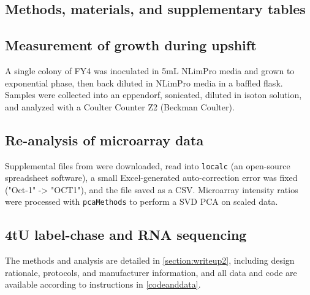 \subsection{Methods, materials, and supplementary tables}


\subsection{Measurement of growth during upshift}

A single colony of FY4 was inoculated in 5mL NLimPro 
media and grown to exponential phase, then back diluted in NLimPro media
in a baffled flask. 
Samples were collected into an eppendorf, sonicated,
diluted in isoton solution, and analyzed with a Coulter Counter Z2
(Beckman Coulter).

\subsection{Re-analysis of microarray data} 

Supplemental files from \cite{Airoldi2016} were 
downloaded, read
into \texttt{localc} (an open-source spreadsheet software), 
a small Excel-generated auto-correction error was 
fixed ("Oct-1" -> "OCT1"), and the file saved as a CSV. Microarray 
intensity ratios were processed with 
\texttt{pcaMethods} to perform a SVD PCA on scaled data. 

\subsection{4tU label-chase and RNA sequencing}

The methods and analysis are detailed in \autoref{section:writeup2},
including design rationale, protocols, and manufacturer information,
and all data and code are available according to instructions in
\autoref{codeanddata}.

